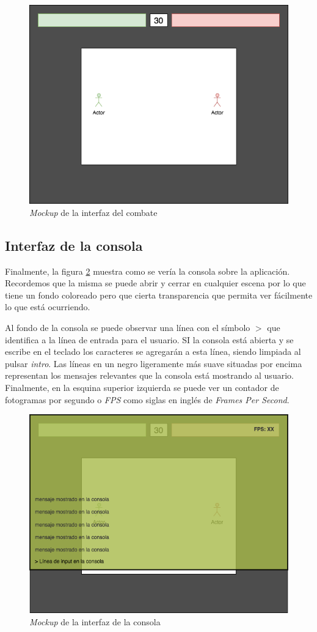 \begin{figure}
	\centerline{\includegraphics[width=12cm]{otros/graphicalInterface/gameplay.png}}
	\caption{\textit{Mockup} de la interfaz del combate}
	\label{inter:combat}
\end{figure}

\subsection{Interfaz de la consola}

Finalmente, la figura \ref{inter:console} muestra como se vería la consola sobre la aplicación. Recordemos que la misma se puede abrir y cerrar en cualquier escena por lo que tiene un fondo coloreado pero que cierta transparencia que permita ver fácilmente lo que está ocurriendo.

\bigskip

Al fondo de la consola se puede observar una línea con el símbolo $>$ que identifica a la línea de entrada para el usuario. SI la consola está abierta y se escribe en el teclado los caracteres se agregarán a esta línea, siendo limpiada al pulsar \textit{intro}. Las líneas en un negro ligeramente más suave situadas por encima representan los mensajes relevantes que la consola está mostrando al usuario. Finalmente, en la esquina superior izquierda se puede ver un contador de fotogramas por segundo o \textit{FPS} como siglas en inglés de \textit{Frames Per Second}.

\begin{figure}
	\centerline{\includegraphics[width=12cm]{otros/graphicalInterface/console.png}}
	\caption{\textit{Mockup} de la interfaz de la consola}
	\label{inter:console}
\end{figure}


